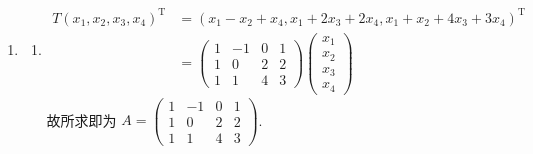\begin{enumerate}
\begin{enumerate}
        一直如此可得到 \(k_1 A^{n-1}\beta=0\). 由条件 \(A^i\beta\neq 0, \enspace\forall 0\leqslant i \leqslant n-1 \implies k_1=0\)，将其回代可得到 $k_2 = \cdots = k_n = 0$. 即这些向量线性无关，且长度为 $n$，因此是一组基.
        \item 由(1)知对 \(\forall \alpha \in \mathbf{R}^{n}\)，存在 \(k_{1}, k_{2}, \ldots, k_{n}\) 使得 \(\alpha=k_{1}\beta + k_{2}A\beta+\cdots + k_{n}A^{n - 1}\beta\).

        从而对任意$\alpha$，\(A^n\alpha=k_1 A^n\beta+\cdots+k_n A^{2n-1}\beta=0 \implies A^n=0\).
        \item 即证\(\dim N(A)=1\).

        任取 \(X_{1}, X_{2} \in N(A)\)，设 \(X_{1}=\displaystyle\sum\limits_{i = 1}^{n}a_{i}A^{i - 1}\beta\)，\(X_{2}=\displaystyle\sum\limits_{i = 1}^{n}b_{i}A^{i - 1}\beta\). 则对 \(\forall k_{1}, k_{2} \in \mathbf{R}\)，由 \(k_{1}X_{1}+k_{2}X_{2} \in N(A)\)，有
        \[
        A(k_{1}X_{1}+k_{2}X_{2})=\sum_{i = 1}^{n}(k_{1}a_{i}+k_{2}b_{i})A^{i}\beta=\sum_{i = 1}^{n - 1}(k_{1}a_{i}+k_{2}b_{i})A^{i}\beta = 0.
        \]
        由 \(A\beta, \ldots, A^{n - 1}\beta\) 线性无关知 \(k_{1}a_{i}+k_{2}b_{i}=0, \enspace\forall i = 1,2,\ldots, n - 1\).

        由 \(k_{1}, k_{2}\) 任意性知 \(a_{i}=b_{i}=0, \enspace\forall i = 1,2,\ldots, n - 1\).
        故 \(X_{1}=a_{n}A^{n - 1}\beta\)，\(X_{2}=b_{n}A^{n - 1}\beta\)，从而 \(X_{1}\) 与 \(X_{2}\) 线性相关，故 \(\dim N(A)=1\).
    \end{enumerate}

    \item
    \begin{enumerate}
        \item
        \begin{align*}
            T(x_{1}, x_{2}, x_{3}, x_{4})^\mathrm{T} &= (x_{1}-x_{2}+x_{4}, x_{1}+2x_{3}+2x_{4}, x_{1}+x_{2}+4x_{3}+3x_{4})^\mathrm{T} \\
            &=\begin{pmatrix}
                1 & -1 & 0 & 1 \\
                1 & 0 & 2 & 2 \\
                1 & 1 & 4 & 3
            \end{pmatrix}\begin{pmatrix}
                x_{1} \\
                x_{2} \\
                x_{3} \\
                x_{4}
            \end{pmatrix}
        \end{align*}
        故所求即为 \(A=\begin{pmatrix}
            1 & -1 & 0 & 1 \\
            1 & 0 & 2 & 2 \\
            1 & 1 & 4 & 3
        \end{pmatrix}\).


\end{enumerate}
\end{enumerate}
